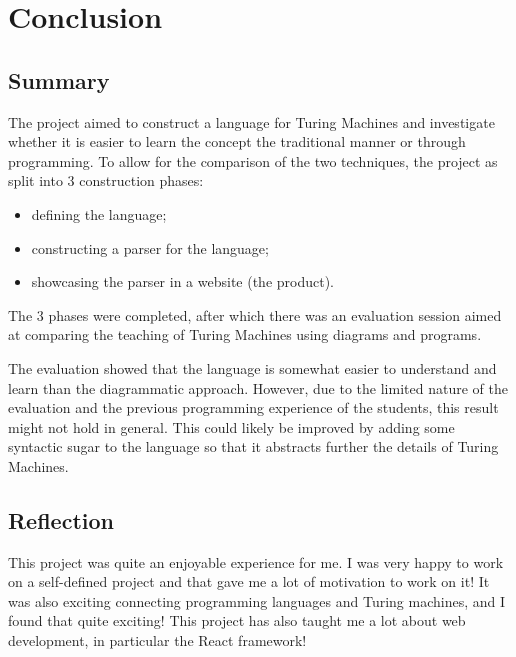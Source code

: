 \chapter{Conclusion}


\section{Summary}
The project aimed to construct a language for Turing Machines and investigate whether it is easier to learn the concept the traditional manner or through programming. To allow for the comparison of the two techniques, the project as split into 3 construction phases:
\begin{itemize}
    \item defining the language;
    \item constructing a parser for the language;
    \item showcasing the parser in a website (the product).
\end{itemize}
The 3 phases were completed, after which there was an evaluation session aimed at comparing the teaching of Turing Machines using diagrams and programs.

The evaluation showed that the language is somewhat easier to understand and learn than the diagrammatic approach. However, due to the limited nature of the evaluation and the previous programming experience of the students, this result might not hold in general. This could likely be improved by adding some syntactic sugar to the language so that it abstracts further the details of Turing Machines.

\section{Reflection}
This project was quite an enjoyable experience for me. I was very happy to work on a self-defined project and that gave me a lot of motivation to work on it! It was also exciting connecting programming languages and Turing machines, and I found that quite exciting! This project has also taught me a lot about web development, in particular the React framework!

